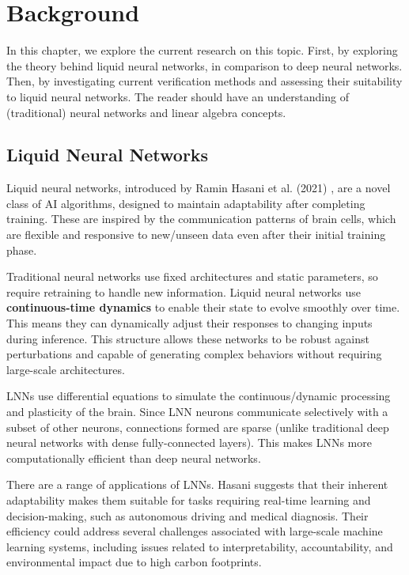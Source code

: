 \chapter{Background}

In this chapter, we explore the current research on this topic. First, by exploring the theory behind liquid neural networks, in comparison to deep neural networks. Then, by investigating current verification methods and assessing their suitability to liquid neural networks. The reader should have an understanding of (traditional) neural networks and linear algebra concepts.

\section{Liquid Neural Networks}

Liquid neural networks, introduced by Ramin Hasani et al. (2021) \cite{hasaniLiquidTimeconstantNetworks2021}, are a novel class of AI algorithms, designed to maintain adaptability after completing training. These are inspired by the communication patterns of brain cells, which are flexible and responsive to new/unseen data even after their initial training phase. 

Traditional neural networks use fixed architectures and static parameters, so require retraining to handle new information. Liquid neural networks use \textbf{continuous-time dynamics} to enable their state to evolve smoothly over time. This means they can dynamically adjust their responses to changing inputs during inference. This structure allows these networks to be robust against perturbations and capable of generating complex behaviors without requiring large-scale architectures.

LNNs use differential equations to simulate the continuous/dynamic processing and plasticity of the brain. Since LNN neurons communicate selectively with a subset of other neurons, connections formed are sparse (unlike traditional deep neural networks with dense fully-connected layers). This makes LNNs more computationally efficient than deep neural networks.

There are a range of applications of LNNs. Hasani suggests that their inherent adaptability makes them suitable for tasks requiring real-time learning and decision-making, such as autonomous driving and medical diagnosis. Their efficiency could address several challenges associated with large-scale machine learning systems, including issues related to interpretability, accountability, and environmental impact due to high carbon footprints. \cite{tedxtalksLiquidNeuralNetworks2023}

